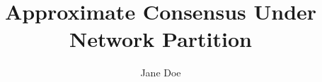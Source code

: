 \documentclass[gpscopy,onehalfspacing,11pt]{ubcdiss}
\title{Approximate Consensus Under Network Partition}
\author{Jane Doe}
\begin{document}
\maketitle
\makecommitteepage


\cleardoublepage


\cleardoublepage

\tableofcontents
\cleardoublepage

\listoftables
\cleardoublepage

\listoffigures
\cleardoublepage

\textspacing



\mainmatter




\begin{singlespace}
\raggedright


\end{singlespace}

\backmatter
\end{document}
